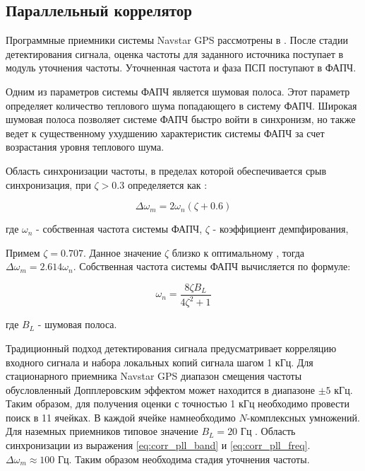 \subsection{Параллельный коррелятор}

Программные приемники системы Navstar GPS рассмотрены в \cite{tsui, akos-book}.
После стадии детектирования сигнала, оценка частоты для заданного источника поступает в модуль уточнения частоты.
Уточненная частота и фаза ПСП поступают в ФАПЧ.

Одним из параметров системы ФАПЧ является шумовая полоса.
Этот параметр определяет количество теплового шума попадающего в систему ФАПЧ. Широкая шумовая полоса позволяет системе ФАПЧ быстро войти в синхронизм,
но также ведет к существенному ухудшению характеристик системы ФАПЧ за счет возрастания уровня теплового шума.

Область синхронизации частоты, в пределах которой обеспечивается срыв синхронизация, при ${\zeta>0.3}$ определяется как \cite{spilker-book}:

\begin{center}
\begin{equation}
	\label{eq:corr_pll_band}
	\Delta \omega_m = 2 \omega_n (\zeta + 0.6)
\end{equation}
\end{center}
где ${\omega_n}$ - собственная частота системы ФАПЧ, ${\zeta}$ - коэффициент демпфирования,

Примем ${\zeta=0.707}$. Данное значение ${\zeta}$ близко к оптимальному \cite{tsui, spilker-book}, тогда ${\Delta \omega_m = 2.614 \omega_n}$.
Собственная частота системы ФАПЧ вычисляется по формуле:

\begin{center}
\begin{equation}
	\label{eq:corr_pll_freq}
	\omega_n = \frac{8 \zeta B_L}{4 \zeta^2 + 1} 
\end{equation}
\end{center}
где ${B_L}$ - шумовая полоса.

Традиционный подход детектирования сигнала предусматривает корреляцию входного сигнала и набора локальных копий сигнала шагом 1 кГц.
Для стационарного приемника Navstar GPS диапазон смещения частоты обусловленный Допплеровским эффектом \cite{tsui} может находится в диапазоне ${\pm 5}$ кГц.
Таким образом, для получения оценки с точностью 1 кГц необходимо провести поиск в 11 ячейках. В каждой ячейке намнеобходимо ${N}$-комплексных умножений.
Для наземных приемников типовое значение  ${B_L=20}$ Гц \cite{tsui, akos-book}. Область синхронизации из выражения \ref{eq:corr_pll_band} и  \ref{eq:corr_pll_freq}.
${\Delta \omega_m \approx 100}$ Гц. Таким образом необходима стадия уточнения частоты.

